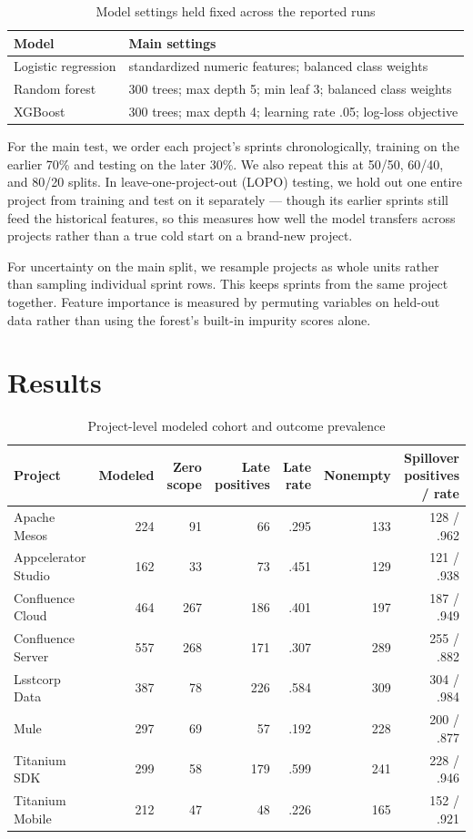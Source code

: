 \documentclass[conference]{IEEEtran}
\begin{document}
\begin{table}[!htb]
\centering\scriptsize
\caption{Model settings held fixed across the reported runs}
\label{tab:settings}
\setlength{\tabcolsep}{2.4pt}
\begin{tabular}{@{}p{1.65cm}p{5.1cm}@{}}
\toprule
Model & Main settings\\
\midrule
Logistic regression & standardized numeric features; balanced class weights\\
Random forest & 300 trees; max depth 5; min leaf 3; balanced class weights\\
XGBoost & 300 trees; max depth 4; learning rate .05; log-loss objective\\
\bottomrule
\end{tabular}
\end{table}

For the main test, we order each project's sprints chronologically, training on the earlier 70\% and testing on the later 30\%. We also repeat this at 50/50, 60/40, and 80/20 splits. In leave-one-project-out (LOPO) testing, we hold out one entire project from training and test on it separately --- though its earlier sprints still feed the historical features, so this measures how well the model transfers across projects rather than a true cold start on a brand-new project.

For uncertainty on the main split, we resample projects as whole units rather than sampling individual sprint rows. This keeps sprints from the same project together. Feature importance is measured by permuting variables on held-out data rather than using the forest's built-in impurity scores alone.

\section{Results}
\begin{table}[t]
\centering\scriptsize
\caption{Project-level modeled cohort and outcome prevalence}
\label{tab:projectprev}
\setlength{\tabcolsep}{3.4pt}
\begin{tabular}{@{}lrrrrrr@{}}
\toprule
Project & Modeled & Zero scope & Late positives & Late rate & Nonempty & Spillover positives / rate\\
\midrule
Apache Mesos & 224 & 91 & 66 & .295 & 133 & 128 / .962\\
Appcelerator Studio & 162 & 33 & 73 & .451 & 129 & 121 / .938\\
Confluence Cloud & 464 & 267 & 186 & .401 & 197 & 187 / .949\\
Confluence Server & 557 & 268 & 171 & .307 & 289 & 255 / .882\\
Lsstcorp Data & 387 & 78 & 226 & .584 & 309 & 304 / .984\\
Mule & 297 & 69 & 57 & .192 & 228 & 200 / .877\\
Titanium SDK & 299 & 58 & 179 & .599 & 241 & 228 / .946\\
Titanium Mobile & 212 & 47 & 48 & .226 & 165 & 152 / .921\\
\bottomrule
\end{tabular}
\end{table}
\end{document}
